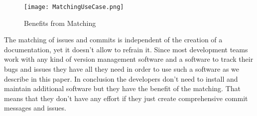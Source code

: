 \begin{figure}[H]
\centering
\texttt{[image: MatchingUseCase.png]}
\caption{Benefits from Matching}
\label{MatchingBenefits}
\end{figure}

The matching of issues and commits is independent of the creation of a documentation, yet it doesn't allow
to refrain it. Since most development teams work with any kind of version management software and a
software to track their bugs and issues they have all they need in order to use such a software as we
describe in this paper. In conclusion the developers don't need to install and maintain additional
software but they have the benefit of the matching. That means that they don't have any effort if they
just create comprehensive commit messages and issues.